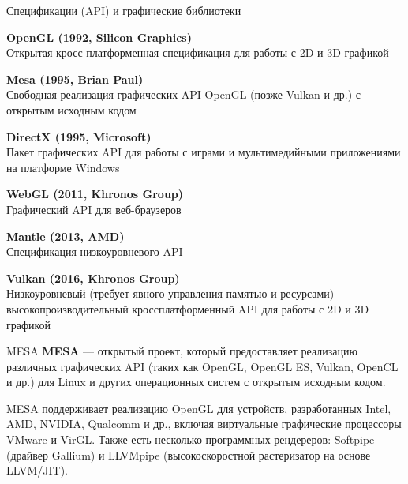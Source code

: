 \documentclass{beamer}
\begin{document}
\begin{frame}{Спецификации (API) и графические библиотеки}

	{\small
		\textbf{OpenGL (1992, Silicon Graphics)} \\
		Открытая кросс-платформенная спецификация для работы с 2D и 3D графикой

		\textbf{Mesa (1995, Brian Paul)} \\
		Свободная реализация графических API OpenGL (позже Vulkan и др.) с открытым исходным кодом

		\textbf{DirectX (1995, Microsoft)} \\
		Пакет графических API для работы с играми и мультимедийными приложениями на платформе Windows

		\textbf{WebGL (2011, Khronos Group)} \\
		Графический API для веб-браузеров

		\textbf{Mantle (2013, AMD)} \\
		Спецификация низкоуровневого API

		\textbf{Vulkan (2016, Khronos Group)} \\
		Низкоуровневый (требует явного управления памятью и ресурсами) высокопроизводительный кроссплатформенный API для работы с 2D и 3D графикой
	}



\end{frame}

\begin{frame}{MESA}
	\textbf{MESA} --- открытый проект, который предоставляет реализацию различных графических API (таких как OpenGL, OpenGL ES, Vulkan, OpenCL и др.) для Linux и других операционных систем с открытым исходным кодом.

	MESA поддерживает реализацию OpenGL для устройств, разработанных Intel, AMD, NVIDIA, Qualcomm и др., включая виртуальные графические процессоры VMware и VirGL.
	Также есть несколько программных рендереров: Softpipe (драйвер Gallium) и LLVMpipe (высокоскоростной растеризатор на основе LLVM/JIT).


\end{frame}
\end{document}
